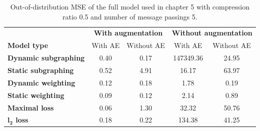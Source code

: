 \documentclass[12pt,a4paper]{report}
\begin{document}
\begin{appendices}
\begin{table}
\centering
\caption{Out-of-distribution MSE of the full model used in chapter 5 with compression ratio 0.5 and number of message passings 5.}
\label{table_0.5_5}
\begin{tabular}{lcccc}
\toprule
 & \multicolumn{2}{c}{\textbf{With augmentation}} & \multicolumn{2}{c}{\textbf{Without augmentation}} \\
 \cmidrule{2-3} \cmidrule{4-5}
\textbf{Model type} & With AE & Without AE & With AE & Without AE \\
\midrule
\textbf{Dynamic subgraphing} & 0.40 & 0.17 & 147349.36 & 24.95 \\
\textbf{Static subgraphing} & 0.52 & 4.91 & 16.17 & 63.97 \\
\textbf{Dynamic weighting} & 0.12 & 0.18 & 1.78 & 0.19 \\
\textbf{Static weighting} & 0.09 & 0.12 & 2.14 & 0.89 \\
\textbf{Maximal loss} & 0.06 & 1.30 & 32.32 & 50.76 \\
\textbf{$\boldsymbol{l_2}$ loss} & 0.18 & 0.22 & 134.38 & 41.25 \\
\bottomrule
\end{tabular}
\end{table}

\end{appendices}
\end{document}
